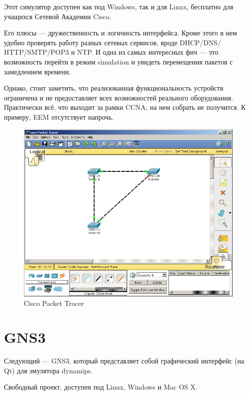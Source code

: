 \documentclass[a4paper,14pt]{extreport}
\begin{document}
	Этот симулятор доступен как под Windows, так и для Linux, бесплатно для учащихся Сетевой Академии Cisco.
	
	Его плюсы — дружественность и логичность интерфейса. Кроме этого в нем удобно проверять работу разных сетевых сервисов, вроде DHCP/DNS/ HTTP/SMTP/POP3 и NTP.
	И одна из самых интересных фич — это возможность перейти в режим simulation и увидеть перемещения пакетов с замедлением времени.
	
	Однако, стоит заметить, что реализованная функциональность устройств ограничена и не предоставляет всех возможностей реального оборудования. Практически всё, что выходит за рамки CCNA, на нем собрать не получится. К примеру, EEM отсутствует напрочь.
	
	\begin{figure}[h!]
	\centering
	\includegraphics[width=0.9\linewidth]{pic/packet_tracer}
	\caption{Cisco Packet Tracer}
	\label{fig:packet_tracer}
	\end{figure}
		
	\section{GNS3}
	
	
	Следующий — GNS3, который представляет собой графический интерфейс (на Qt) для эмулятора dynamips.
	
	
	
	Свободный проект, доступен под Linux, Windows и Mac OS X.
	
\end{document}
